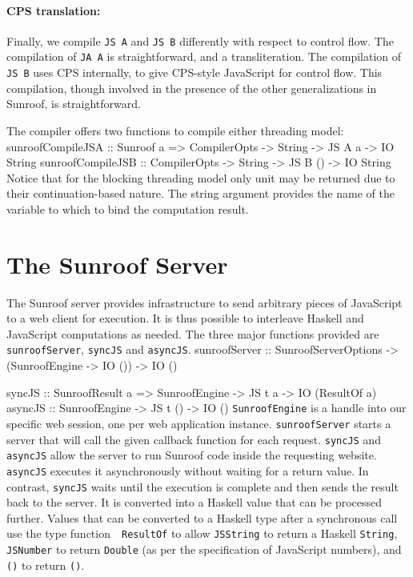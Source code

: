 \documentclass{llncs}
\newcommand{\Src}[1]{{\tt{#1}}}
\newenvironment{Code}{\verbatim}{\endverbatim}
\begin{document}
\paragraph{CPS translation:}

Finally, we compile \Src{JS A} and \Src{JS B} differently with respect to control flow.
The compilation of \Src{JA A} is straightforward, and a transliteration.
The compilation of \Src{JS B} uses CPS internally, to give CPS-style JavaScript for
control flow. This compilation, though involved in the presence of the other
generalizations in Sunroof, is straightforward.

The compiler offers two functions to compile either threading 
model:
\begin{Code}
sunroofCompileJSA :: Sunroof a 
                  => CompilerOpts -> String -> JS A a  -> IO String
sunroofCompileJSB :: CompilerOpts -> String -> JS B () -> IO String
\end{Code}
Notice that for the blocking threading model only unit
may be returned due to their continuation-based nature. 
The string argument provides the name of the variable to which to
bind the computation result.

\section{The Sunroof Server}
\label{sec:server}

The Sunroof server provides infrastructure to send arbitrary pieces 
of JavaScript to a web client for execution. 
It is thus possible to interleave Haskell and JavaScript 
computations as needed. The three major functions
provided are \Src{sunroofServer}, \Src{syncJS} and \Src{asyncJS}.
\begin{Code}
sunroofServer :: SunroofServerOptions 
              -> (SunroofEngine -> IO ()) 
              -> IO ()

syncJS  :: SunroofResult a 
        => SunroofEngine -> JS t a -> IO (ResultOf a)
asyncJS :: SunroofEngine -> JS t () -> IO ()
\end{Code}
\Src{SunroofEngine} is a handle into our specific web session, one per web application instance.
\Src{sunroofServer} starts a server that will call the given callback function
for each request.
\Src{syncJS} and \Src{asyncJS} allow the server
to run Sunroof code inside the requesting website.
\Src{asyncJS} executes it asynchronously without 
waiting for a return value. In contrast, 
\Src{syncJS} waits until the execution is complete and
then sends the result back to the server. It
is converted into a Haskell value that can be processed further. 
Values that can be converted to a Haskell type after a synchronous
call use the type function~\cite{..}~\Src{ResultOf} to
allow \Src{JSString} to return a Haskell \Src{String}, 
\Src{JSNumber} to return \Src{Double} (as per the specification
of JavaScript numbers), and \Src{()} to return \Src{()}.
\end{document}
